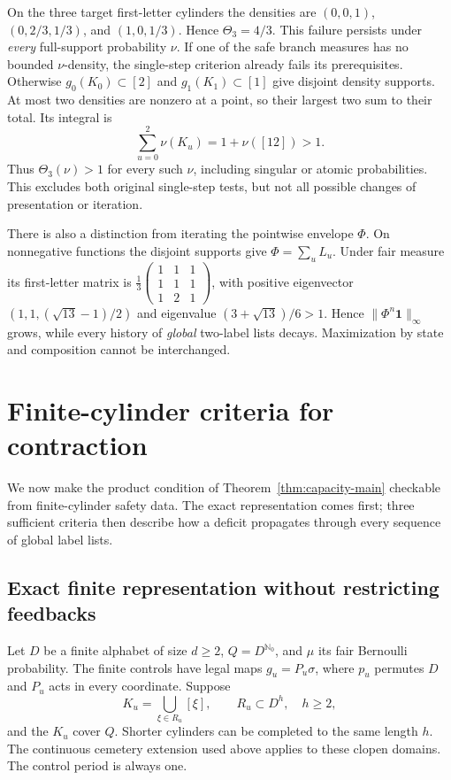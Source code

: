 \documentclass[11pt,reqno]{amsart}
\numberwithin{equation}{section}
\theoremstyle{definition}
\newcommand{\Nzero}{\mathbb N_0}
\newcommand{\one}{\mathbf 1}
\begin{document}
On the three target first-letter cylinders the densities are
$(0,0,1)$, $(0,2/3,1/3)$, and $(1,0,1/3)$.
Hence $\Theta_3=4/3$. This failure persists under \emph{every}
full-support probability $\nu$. If one of the safe branch measures
has no bounded $\nu$-density, the single-step criterion already
fails its prerequisites. Otherwise $g_0(K_0)\subset[2]$ and
$g_1(K_1)\subset[1]$ give disjoint density supports. At most two
densities are nonzero at a point, so their largest two sum to their
total. Its integral is
\[
 \sum_{u=0}^2\nu(K_u)=1+\nu([12])>1.
\]
Thus $\Theta_3(\nu)>1$ for every such $\nu$, including singular
or atomic probabilities. This excludes both original single-step
tests, but not all possible changes of presentation or iteration.

There is also a distinction from iterating the pointwise envelope
$\Phi$. On nonnegative functions the disjoint supports give
$\Phi=\sum_uL_u$. Under fair measure its first-letter matrix is
$\frac13\left(\begin{smallmatrix}1&1&1\\1&1&1\\1&2&1\end{smallmatrix}\right)$,
with positive eigenvector
$(1,1,(\sqrt{13}-1)/2)$ and eigenvalue
$(3+\sqrt{13})/6>1$. Hence $\|\Phi^n\one\|_\infty$ grows,
while every history of \emph{global} two-label lists decays.
Maximization by state and composition cannot be interchanged.


\section{Finite-cylinder criteria for contraction}\label{sec:cylinder}

We now make the product condition of Theorem~\ref{thm:capacity-main}
checkable from finite-cylinder safety data. The exact representation
comes first; three sufficient criteria then describe how a deficit
propagates through every sequence of global label lists.

\subsection{Exact finite representation without restricting feedbacks}
Let $D$ be a finite alphabet of size $d\ge2$, $Q=D^{\Nzero}$,
and $\mu$ its fair Bernoulli probability. The finite controls have
legal maps $g_u=P_u\sigma$, where $p_u$ permutes $D$ and $P_u$
acts in every coordinate. Suppose
\[
 K_u=\bigcup_{\xi\in R_u}[\xi],\qquad R_u\subset D^h,
 \quad h\ge2,
\]
and the $K_u$ cover $Q$. Shorter cylinders can be completed to the
same length $h$. The continuous cemetery extension used above
applies to these clopen domains. The control period is always one.
\end{document}
